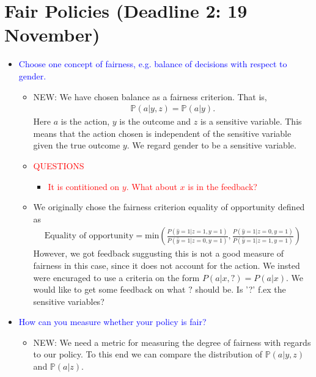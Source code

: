 
\section*{Fair Policies (Deadline 2: 19 November)}
\begin{itemize}
    \item \textcolor{blue}{Choose one concept of fairness, e.g. balance of decisions with respect to gender.}
    \begin{itemize}
        \item NEW: We have chosen balance as a fairness criterion. That is, 
        \begin{align*}
            \mathbb{P}(a|y,z) = \mathbb{P}(a|y)
        .\end{align*}
        Here $a$ is the action, $y$ is the outcome and $z$ is a sensitive variable. 
        This means that the action chosen is independent of the sensitive variable given the true outcome $y$. 
        We regard gender to be a sensitive variable. 
        \item \textcolor{red}{QUESTIONS}
        \begin{itemize}
            \item \textcolor{red}{It is contitioned on $y$. What about $x$ is in the feedback?}
        \end{itemize}
        \item We originally chose the fairness criterion equality of opportunity defined as 
        \begin{align*}
            \text{Equality of opportunity} = \text{min} \left( \frac{P(\hat{y} = 1 | z = 1, y = 1)}{P(\hat{y} = 1 | z=0, y=1)} , \frac{P(\hat{y} = 1 | z = 0, y = 1)}{P(\hat{y} = 1 | z=1, y=1)}\right)
        \end{align*}
        However, we got feedback suggusting this is not a good measure of fairness in this case, since it does not account for the action. 
        We insted were encuraged to use a criteria on the form $P(a|x,?) = P(a|x)$. 
        We would like to get some feedback on what $?$ should be. Is '?' f.ex the sensitive variables?
    \end{itemize}
    \item \textcolor{blue}{How can you measure whether your policy is fair?}
    \begin{itemize}
        \item NEW: We need a metric for measuring the degree of fairness with regards to our policy. 
        To this end we can compare the distribution of $\mathbb{P}(a|y,z)$ and $\mathbb{P}(a|z)$. 

\end{itemize}
\end{itemize}
